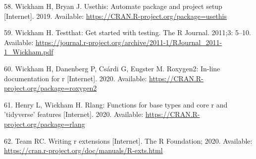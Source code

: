 \documentclass[10pt,letterpaper]{article}
\begin{document}
\leavevmode\hypertarget{ref-usethis}{}%
58. Wickham H, Bryan J. Usethis: Automate package and project setup
{[}Internet{]}. 2019. Available:
\url{https://CRAN.R-project.org/package=usethis}

\leavevmode\hypertarget{ref-testthat}{}%
59. Wickham H. Testthat: Get started with testing. The R Journal.
2011;3: 5--10. Available:
\url{https://journal.r-project.org/archive/2011-1/RJournal_2011-1_Wickham.pdf}

\leavevmode\hypertarget{ref-roxygen2}{}%
60. Wickham H, Danenberg P, Csárdi G, Eugster M. Roxygen2: In-line
documentation for r {[}Internet{]}. 2020. Available:
\url{https://CRAN.R-project.org/package=roxygen2}

\leavevmode\hypertarget{ref-rlang}{}%
61. Henry L, Wickham H. Rlang: Functions for base types and core r and
'tidyverse' features {[}Internet{]}. 2020. Available:
\url{https://CRAN.R-project.org/package=rlang}

\leavevmode\hypertarget{ref-Rcore2020}{}%
62. Team RC. Writing r extensions {[}Internet{]}. The R Foundation;
2020. Available:
\url{https://cran.r-project.org/doc/manuals/R-exts.html}

\nolinenumbers
\end{document}

